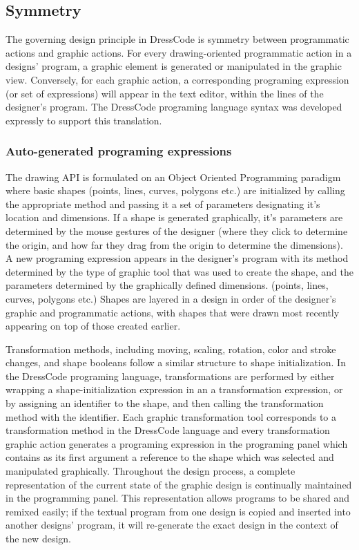 \documentclass{sigchi}
\begin{document}
\subsection{Symmetry}
The governing design principle in DressCode is symmetry between programmatic actions and graphic actions. For every drawing-oriented programmatic action in a designs' program, a graphic element is generated or manipulated in the graphic view. Conversely, for each graphic action, a corresponding programing expression (or set of expressions) will appear in the text editor, within the lines of the designer's program. The DressCode programing language syntax was developed expressly to support this translation. 

\subsubsection{Auto-generated programing expressions}
The drawing API is formulated on an Object Oriented Programming paradigm where basic shapes (points, lines, curves, polygons etc.) are initialized by calling the appropriate method and passing it a set of parameters designating it's location and dimensions. If a shape is generated graphically, it's parameters are determined by the mouse gestures of the designer (where they click to determine the origin, and how far they drag from the origin to determine the dimensions). A new programing expression appears in the designer's program with its method determined by the type of graphic tool that was used to create the shape, and the parameters determined by the graphically defined dimensions. (points, lines, curves, polygons etc.) Shapes are layered in a design in order of the designer's graphic and programmatic actions, with shapes that were drawn most recently appearing on top of those created earlier.

Transformation methods, including moving, scaling, rotation, color and stroke changes, and shape booleans follow a similar structure to shape initialization. In the DressCode programing language, transformations are performed by either wrapping a shape-initialization expression in an a transformation expression, or by assigning an identifier to the shape, and then calling the transformation method with the identifier. Each graphic transformation tool corresponds to a transformation method in the DressCode language and every transformation graphic action generates a programing expression in the programing panel which contains as its first argument a reference to the shape which was selected and manipulated graphically. Throughout the design process, a complete representation of the current state of the graphic design is continually maintained in the programming panel. This representation allows programs to be shared and remixed easily; if the textual program from one design is copied and inserted into another designs' program, it will re-generate the exact design in the context of the new  design. 
\end{document}
